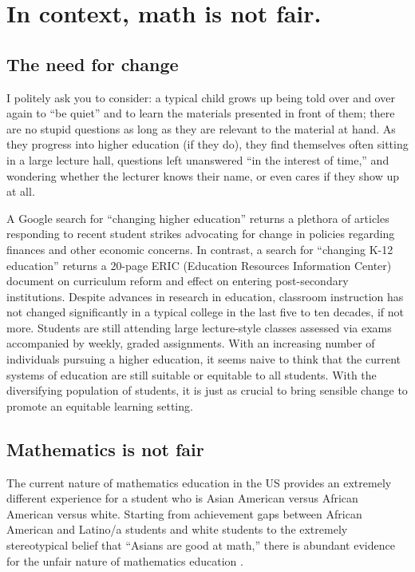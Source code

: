 \chapter{In context, math is not fair.}

\section{The need for change}
I politely ask you to consider: a typical child grows up being told over and over again to ``be quiet'' and to learn the materials presented in front of them; there are no stupid questions as long as they are relevant to the material at hand. As they progress into higher education (if they do), they find themselves often sitting in a large lecture hall, questions left unanswered ``in the interest of time,'' and wondering whether the lecturer knows their name, or even cares if they show up at all.

A Google search for ``changing higher education'' returns a plethora of articles responding to recent student strikes advocating for change in policies regarding finances and other economic concerns. In contrast, a search for ``changing K-12 education'' returns a 20-page ERIC (Education Resources Information Center) document on curriculum reform and effect on entering post-secondary institutions. Despite advances in research in education, classroom instruction has not changed significantly in a typical college in the last five to ten decades, if not more. Students are still attending large lecture-style classes assessed via exams accompanied by weekly, graded assignments. With an increasing number of individuals pursuing a higher education, it seems naive to think that the current systems of education are still suitable or equitable to all students. With the diversifying population of students, it is just as crucial to bring sensible change to promote an equitable learning setting.

\section{Mathematics is not fair}
The current nature of mathematics education in the US provides an extremely different experience for a student who is Asian American versus African American versus white. Starting from achievement gaps between African American and Latino/a students and white students to  the extremely stereotypical belief that ``Asians are good at math,'' there is abundant evidence for the unfair nature of mathematics education \citep{alfinio_flores_examining_2007}.

